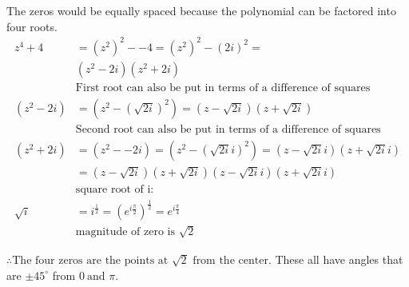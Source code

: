 \documentclass{article}
\begin{document}
The zeros would be equally spaced because the polynomial can be factored into four roots.
\begin{align*}
  z^4+4 &= (z^2)^2--4 = (z^2)^2-(2i)^2 = \\
  &(z^2 - 2i)(z^2 + 2i) \\
        &\text{First root can also be put in terms of a difference of squares}\\
  (z^2 - 2i) &= (z^2 - (\sqrt{2i})^2) = (z - \sqrt{2i})(z + \sqrt{2i})\\
        &\text{Second root can also be put in terms of a difference of squares}\\
  (z^2 + 2i) & = (z^2 -- 2i) = (z^2 -(\sqrt{2i}i)^2) = (z - \sqrt{2i}i)(z + \sqrt{2i}i)\\
        &= (z - \sqrt{2i})(z + \sqrt{2i})(z - \sqrt{2i}i)(z + \sqrt{2i}i)\\
        &\text{square root of i:}\\
  \sqrt{i} &= i^{\frac{1}{2}} = (e^{i\frac{\pi}{2}})^{\frac{1}{2}} = e^{i\frac{\pi}{4}}\\
        &\text{magnitude of zero is }\sqrt{2}
\end{align*}

$\therefore \text{The four zeros are the points at }\sqrt{2}\text{ from the center.}$ These all have angles that are $\pm 45^{\circ}$ from $0\ \text{and }\pi$.
\end{document}
